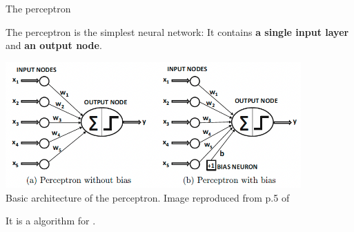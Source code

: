 %
%
%

\begin{frame}[t]{The perceptron}

    The \Gls{perceptron} 
    is the simplest neural network:
    It contains {\bf a single input layer} and {\bf an output node}.

    \begin{center}
        \includegraphics[width=0.85\textwidth]{./images/perceptron/basic_architecture.png}\\
        {\scriptsize \color{col:attribution} 
        Basic architecture of the perceptron. 
        Image reproduced from p.5 of \cite{Aggarwal:2018SpringerDL}}\\
    \end{center}

    It is a 
     algorithm for 
    .

\end{frame}

%
%
%

